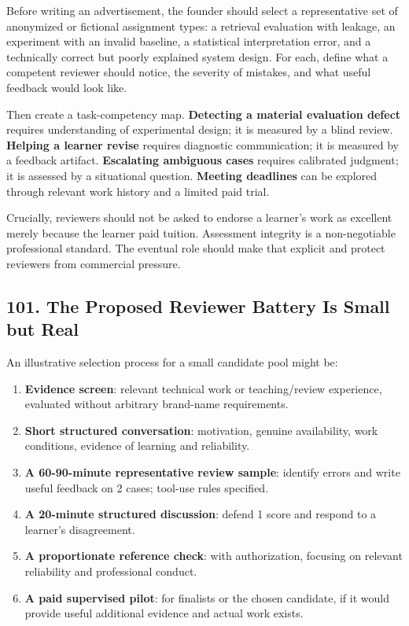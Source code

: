 Before writing an advertisement, the founder should select a representative set of anonymized or fictional assignment types: a retrieval evaluation with leakage, an experiment with an invalid baseline, a statistical interpretation error, and a technically correct but poorly explained system design. For each, define what a competent reviewer should notice, the severity of mistakes, and what useful feedback would look like.

Then create a task-competency map. \textbf{Detecting a material evaluation defect} requires understanding of experimental design; it is measured by a blind review. \textbf{Helping a learner revise} requires diagnostic communication; it is measured by a feedback artifact. \textbf{Escalating ambiguous cases} requires calibrated judgment; it is assessed by a situational question. \textbf{Meeting deadlines} can be explored through relevant work history and a limited paid trial.

Crucially, reviewers should not be asked to endorse a learner's work as excellent merely because the learner paid tuition. Assessment integrity is a non-negotiable professional standard. The eventual role should make that explicit and protect reviewers from commercial pressure.

\subsection*{101. The Proposed Reviewer Battery Is Small but Real}

An illustrative selection process for a small candidate pool might be:
\begin{enumerate}[leftmargin=*]
\item \textbf{Evidence screen}: relevant technical work or teaching/review experience, evaluated without arbitrary brand-name requirements.
\item \textbf{Short structured conversation}: motivation, genuine availability, work conditions, evidence of learning and reliability.
\item \textbf{A 60-90-minute representative review sample}: identify errors and write useful feedback on 2 cases; tool-use rules specified.
\item \textbf{A 20-minute structured discussion}: defend 1 score and respond to a learner's disagreement.
\item \textbf{A proportionate reference check}: with authorization, focusing on relevant reliability and professional conduct.
\item \textbf{A paid supervised pilot}: for finalists or the chosen candidate, if it would provide useful additional evidence and actual work exists.
\end{enumerate}

